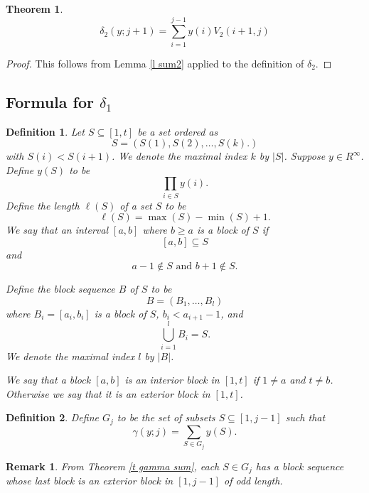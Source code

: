 \documentclass[11pt, oneside]{article}   	%
\newtheorem{theorem}{Theorem}
\newtheorem{definition}{Definition}
\newtheorem{remark}{Remark}
\begin{document}
\begin{theorem} \label{t delta2}
\[
\delta_2(y; j+1) = \sum_{i=1}^{j-1} y(i)V_2(i+1,j)
\]
\end{theorem}
\begin{proof}
This follows from Lemma \ref{l sum2} applied to the definition of $\delta_2$.
\end{proof}

\subsection{Formula for $\delta_1$}

\begin{definition} 
Let $S \subseteq [1,t]$ be a set ordered as 
\[
S = ( S(1), S(2), \ldots, S(k).)
\]
with $S(i) < S(i+1)$. We denote the maximal index $k$ by $|S|$. Suppose $y \in R^\infty$. 
Define $y(S)$ to be 
\[
\prod_{i\in S} y(i).
\] 
Define the length $\ell(S)$ of a set $S$ to be 
\[
\ell(S) = \max(S) - \min(S)+1.
\]
We say that an interval $[a,b]$ where $b \geq a$ is a \emph{block} of $S$ if 
\[
[a,b] \subseteq S
\] 
and
\[
a-1 \notin S \text{ and } b+1 \notin S. 
\]


Define the block sequence $B$ of $S$ to be 
\[
B = ( B_1, \ldots, B_l)
\]
where $B_i = [a_i, b_i]$ is a block of $S$, $b_i < a_{i+1}-1$, and 
\[
\bigcup_{i=1}^l B_i = S. 
\]
We denote the maximal index $l$ by $|B|$.

We say that a block $[a,b]$ is an \emph{interior block in $[1,t]$} if $1\neq a$ and $t\neq b$. Otherwise we say that it is an \emph{exterior block in $[1,t]$}. 
\end{definition}

\begin{definition}
Define $G_{j}$ to be the set of subsets $S \subseteq [1,j-1]$ such that 
\[
\gamma(y;j) = \sum_{S \in G_j} y(S).
\] 

\end{definition}

\begin{remark} \label{r G}
From Theorem \ref{t gamma sum}, each $S\in G_j$ has a block sequence whose last block is an exterior block in $[1,j-1]$ of odd length.  
\end{remark}
\end{document}
